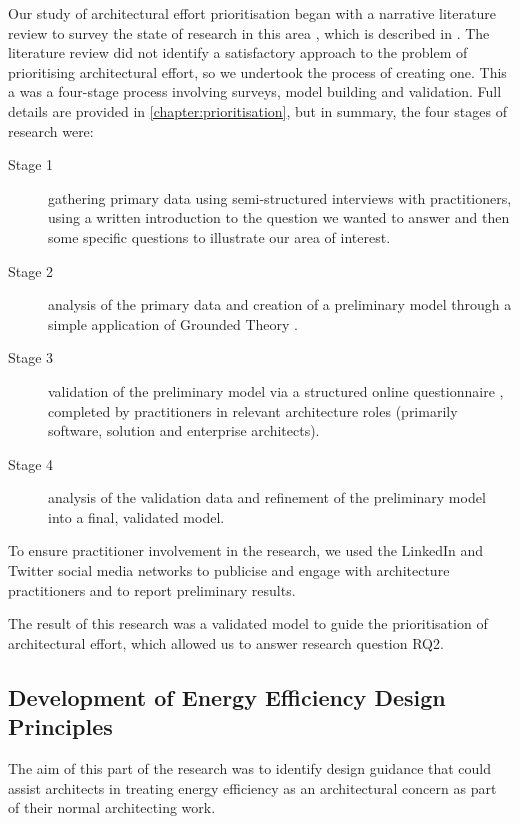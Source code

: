 Our study of architectural effort prioritisation began with a narrative literature review to survey the state of research in this area \cite{baumeister1997-narrativereviews}, which is described in .  The literature review did not identify a satisfactory approach to the problem of prioritising architectural effort, so we undertook the process of creating one.  This a was a four-stage process involving surveys, model building and validation.  Full details are provided in \cref{chapter:prioritisation}, but in summary, the four stages of research were:
\nopagebreak
\begin{description}
	\item [Stage 1] gathering primary data using semi-structured interviews with practitioners, using a written introduction to the question we wanted to answer and then some specific questions to illustrate our area of interest. 
	\item [Stage 2] analysis of the primary data and creation of a preliminary model through a simple application of Grounded Theory \cite{charmaz2006-groundedtheory}.
	\item [Stage 3] validation of the preliminary model via a structured online questionnaire \cite{gillham2000-questionnaire}, completed by practitioners in relevant architecture roles (primarily software, solution and enterprise architects).
	\item [Stage 4] analysis of the validation data and refinement of the preliminary model into a final, validated model.
\end{description}

To ensure practitioner involvement in the research, we used the LinkedIn and Twitter social media networks to publicise and engage with architecture practitioners and to report preliminary results.

The result of this research was a validated model to guide the prioritisation of architectural effort, which allowed us to answer research question RQ2.

\subsection{Development of Energy Efficiency Design Principles}

The aim of this part of the research was to identify design guidance that could assist architects in treating energy efficiency as an architectural concern as part of their normal architecting work.

